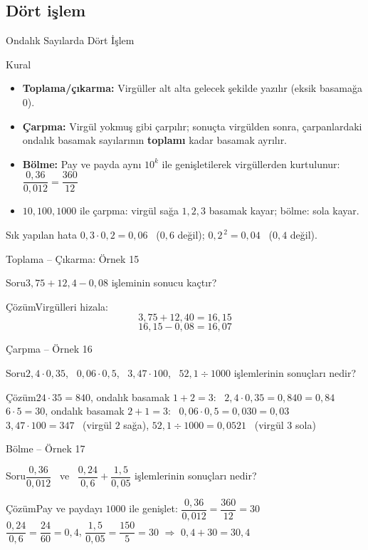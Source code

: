 \documentclass[aspectratio=169,11pt,handout]{beamer}
\newcommand{\soru}[3]{%
\begin{frame}{#1}
  \begin{block}{Soru}\large #2\end{block}
  \pause
  \begin{exampleblock}{Çözüm}\large #3\end{exampleblock}
\end{frame}}
\begin{document}
\subsection{Dört işlem}
\begin{frame}{Ondalık Sayılarda Dört İşlem}
\begin{block}{Kural}
\begin{itemize}
\item \textbf{Toplama/çıkarma:} Virgüller alt alta gelecek şekilde yazılır (eksik basamağa \(0\)).
\item \textbf{Çarpma:} Virgül yokmuş gibi çarpılır; sonuçta virgülden sonra, çarpanlardaki ondalık basamak sayılarının \textbf{toplamı} kadar basamak ayrılır.
\item \textbf{Bölme:} Pay ve payda aynı \(10^k\) ile genişletilerek virgüllerden kurtulunur:\ \(\dfrac{0{,}36}{0{,}012}=\dfrac{360}{12}\)
\item \(10,100,1000\) ile çarpma: virgül sağa \(1,2,3\) basamak kayar; bölme: sola kayar.
\end{itemize}
\end{block}
\begin{alertblock}{Sık yapılan hata}
\(0{,}3\cdot 0{,}2=0{,}06\) \ (\(0{,}6\) değil); \quad \(0{,}2^{\,2}=0{,}04\) \ (\(0{,}4\) değil).
\end{alertblock}
\end{frame}

\soru{Toplama -- Çıkarma: Örnek 15}
{\(3{,}75+12{,}4-0{,}08\) işleminin sonucu kaçtır?}
{Virgülleri hizala:
\[3{,}75+12{,}40=16{,}15\]
\[16{,}15-0{,}08=16{,}07\]}

\soru{Çarpma -- Örnek 16}
{\(2{,}4\cdot 0{,}35\), \ \(0{,}06\cdot 0{,}5\), \ \(3{,}47\cdot 100\), \ \(52{,}1\div 1000\) işlemlerinin sonuçları nedir?}
{\(24\cdot 35=840\), ondalık basamak \(1+2=3\): \ \(2{,}4\cdot 0{,}35=0{,}840=0{,}84\)\\[3pt]
\(6\cdot 5=30\), ondalık basamak \(2+1=3\): \ \(0{,}06\cdot 0{,}5=0{,}030=0{,}03\)\\[3pt]
\(3{,}47\cdot 100=347\) \ (virgül \(2\) sağa), \quad \(52{,}1\div 1000=0{,}0521\) \ (virgül \(3\) sola)}

\soru{Bölme -- Örnek 17}
{\(\dfrac{0{,}36}{0{,}012}\) \ ve \ \(\dfrac{0{,}24}{0{,}6}+\dfrac{1{,}5}{0{,}05}\) işlemlerinin sonuçları nedir?}
{Pay ve paydayı \(1000\) ile genişlet: \quad \(\dfrac{0{,}36}{0{,}012}=\dfrac{360}{12}=30\)\\[4pt]
\(\dfrac{0{,}24}{0{,}6}=\dfrac{24}{60}=0{,}4\), \quad \(\dfrac{1{,}5}{0{,}05}=\dfrac{150}{5}=30\) \quad \(\Rightarrow\) \quad \(0{,}4+30=30{,}4\)}
\end{document}
